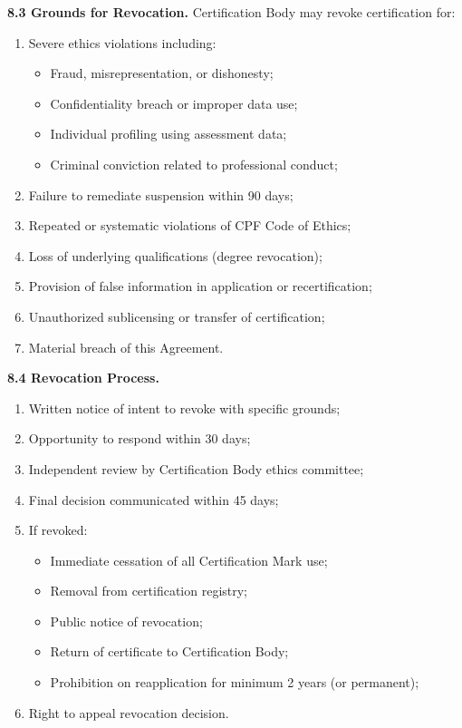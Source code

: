 \documentclass[11pt,a4paper]{article}
\begin{document}
\textbf{8.3 Grounds for Revocation.} Certification Body may revoke certification for:

\begin{enumerate}[label=\alph*)]
\item Severe ethics violations including:
\begin{itemize}
\item Fraud, misrepresentation, or dishonesty;
\item Confidentiality breach or improper data use;
\item Individual profiling using assessment data;
\item Criminal conviction related to professional conduct;
\end{itemize}
\item Failure to remediate suspension within 90 days;
\item Repeated or systematic violations of CPF Code of Ethics;
\item Loss of underlying qualifications (degree revocation);
\item Provision of false information in application or recertification;
\item Unauthorized sublicensing or transfer of certification;
\item Material breach of this Agreement.
\end{enumerate}

\textbf{8.4 Revocation Process.}

\begin{enumerate}[label=\alph*)]
\item Written notice of intent to revoke with specific grounds;
\item Opportunity to respond within 30 days;
\item Independent review by Certification Body ethics committee;
\item Final decision communicated within 45 days;
\item If revoked:
\begin{itemize}
\item Immediate cessation of all Certification Mark use;
\item Removal from certification registry;
\item Public notice of revocation;
\item Return of certificate to Certification Body;
\item Prohibition on reapplication for minimum 2 years (or permanent);
\end{itemize}
\item Right to appeal revocation decision.
\end{enumerate}
\end{document}

